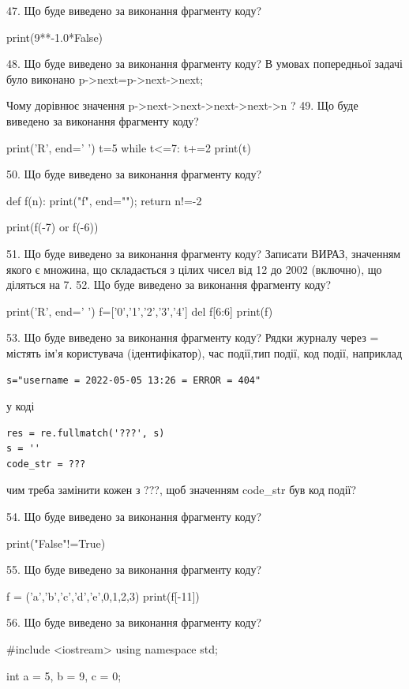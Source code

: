 \documentclass[11pt]{article}
\begin{document}
47. Що буде виведено за виконання фрагменту коду?

print(9**-1.0*False)

48. Що буде виведено за виконання фрагменту коду?
В умовах попередньої задачі було виконано p->next=p->next->next;

Чому дорівнює значення p->next->next->next->next->n ?
49. Що буде виведено за виконання фрагменту коду?

print('R', end=' ')
t=5
while t<=7:
    t+=2
print(t)


50. Що буде виведено за виконання фрагменту коду?

def f(n):
    print("f", end="");
    return n!=-2

print(f(-7) or f(-6))

51. Що буде виведено за виконання фрагменту коду?
Записати ВИРАЗ, значенням якого є множина, що складається з цілих чисел від 12 до 2002 (включно), що діляться на 7.
52. Що буде виведено за виконання фрагменту коду?

print('R', end=' ')
f=['0','1','2','3','4']
del f[6:6]
print(f)


53. Що буде виведено за виконання фрагменту коду?
Рядки журналу через = містять ім'я користувача (ідентифікатор), час події,тип події, код події, наприклад
\begin{verbatim}
s="username = 2022-05-05 13:26 = ERROR = 404"
\end{verbatim}
у коді 
\begin{verbatim}
res = re.fullmatch('???', s) 
s = ''
code_str = ??? 
\end{verbatim}
чим треба замінити кожен з ???, щоб значенням code\_str був код події? 



54. Що буде виведено за виконання фрагменту коду?

print("False"!=True)

55. Що буде виведено за виконання фрагменту коду?

f = ('a','b','c','d','e',0,1,2,3)
print(f[-11])


56. Що буде виведено за виконання фрагменту коду?

#include <iostream>
using namespace std;

int a = 5, b = 9, c = 0;
\end{document}

